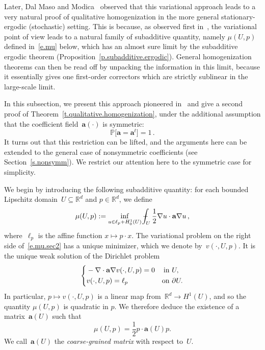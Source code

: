 \documentclass[11pt]{article} %
\numberwithin{equation}{section}
\theoremstyle{definition}
\let\originalleft\left
\let\originalright\right
\renewcommand{\left}{\mathopen{}\mathclose\bgroup\originalleft}
\renewcommand{\right}{\aftergroup\egroup\originalright}
\newcommand*{\Rd}{\ensuremath{\mathbb{R}^d}}
\renewcommand{\a}{\mathbf{a}}
\renewcommand{\P}{\mathbb{P}}
\def\Xint#1{\mathchoice
{\XXint\displaystyle\textstyle{#1}}%
{\XXint\textstyle\scriptstyle{#1}}%
{\XXint\scriptstyle\scriptscriptstyle{#1}}%
{\XXint\scriptscriptstyle\scriptscriptstyle{#1}}%
\!\int}
\def\XXint#1#2#3{{\setbox0=\hbox{$#1{#2#3}{\int}$}
\vcenter{\hbox{$#2#3$}}\kern-.5\wd0}}
\def\fint{\Xint-}
\begin{document}
\smallskip

Later, Dal Maso and Modica~\cite{DM1,DM2} observed that this variational approach leads to a very natural proof of qualitative homogenization in the more general stationary-ergodic (stochastic) setting. This is because, as observed first in~\cite{DM1}, the variational point of view leads to a natural family of subadditive quantity, namely $\mu(U,p)$ defined in~\eqref{e.mu} below, which has an almost sure limit by the subadditive ergodic theorem (Proposition~\ref{p.subadditive.ergodic}). General homogenization theorems can then be read off by unpacking the information in this limit, because it essentially gives one first-order correctors which are strictly sublinear in the large-scale limit.

\smallskip

In this subsection, we present this approach pioneered in~\cite{DGS,DM1,DM2} and give a second proof of Theorem~\ref{t.qualitative.homogenization}, under the additional assumption that the coefficient field~$\a(\cdot)$ is symmetric: 
\begin{equation}
\label{e.symm.sec24}
\P \bigl[  \a = \a^t \bigr] = 1 \,.
\end{equation}
It turns out that this restriction can be lifted, and the arguments here can be extended to the general case of nonsymmetric coefficients (see Section~\ref{s.nonsymm}). We restrict our attention here to the symmetric case for simplicity. 

\smallskip

We begin by introducing the following subadditive quantity: 
for each bounded Lipschitz domain~$U\subseteq \Rd$ and $p\in\Rd$, we define
\begin{equation}
\label{e.mu.sec2}
\mu(U,p) 
:= \inf_{u \in \ell_p+H^1_0(U)} 
\fint_U \frac12\nabla u \cdot \a\nabla u
\,,
\end{equation}
where~$\ell_p$ is the affine function $x\mapsto p\cdot x$.
The variational problem on the right side of~\eqref{e.mu.sec2} has a unique minimizer, which we denote by~$v(\cdot,U,p)$. It is the unique weak solution of the Dirichlet problem 
\begin{equation}
\label{e.DP.sec24}
\left\{
\begin{aligned}
& -\nabla \cdot \a\nabla v(\cdot,U,p) = 0 & \mbox{in} & \ U,  \\
& v(\cdot,U,p) = \ell_p & \mbox{on} & \ \partial U.
\end{aligned}
\right.
\end{equation}
In particular, $p\mapsto v(\cdot,U,p)$ is a linear map from~$\Rd\to H^1(U)$, and so the quantity $\mu(U,p)$ is quadratic in $p$. We therefore deduce the existence of a matrix~$\a(U)$ such that 
\begin{equation}
\label{e.quad.mu.sec2}
\mu(U,p) = \frac12 p\cdot \a(U) p. 
\end{equation}
We call~$\a(U)$ the \emph{coarse-grained matrix} with respect to~$U$. 
\end{document}
